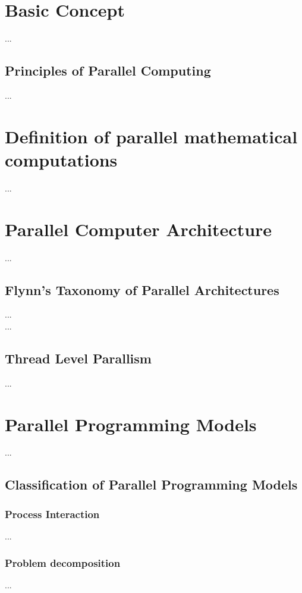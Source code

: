 \section{Basic Concept}

...

\subsection{Principles of Parallel Computing}

...\newpage

\section{Definition of parallel mathematical computations}

...\newpage

\section{Parallel Computer Architecture}

...

\subsection{Flynn's Taxonomy of Parallel Architectures}

...\parencite[see][p5]{internet1}\\
...\parencite[see][p13]{book1}

\subsection{Thread Level Parallism}

...\parencite[see][p24]{book1}

\section{Parallel Programming Models}

...

\subsection{Classification of Parallel Programming Models}

\subsubsection{Process Interaction}

...\parencite[see][p4]{internet1}

\subsubsection{Problem decomposition}

...\parencite[see][p105 ff.]{book1}